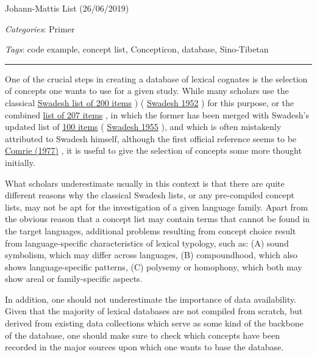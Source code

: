 \documentclass[
  a4paper,
  14pt,
  oneside,
  tablecaptionabove
]{scrbook}
\begin{document}
Johann-Mattis List (26/06/2019)

\emph{Categories}: Primer

\emph{Tags}: code example, concept list, Concepticon, database,
Sino-Tibetan

\begin{center}\rule{0.5\linewidth}{1pt}\end{center}

One of the crucial steps in creating a database of lexical cognates is
the selection of concepts one wants to use for a given study. While many
scholars use the classical
\href{https://concepticon.clld.org/contributions/Swadesh-1952-200}{Swadesh
list of 200 items} ) (
\href{http://bibliography.lingpy.org?key=Swadesh1952}{Swadesh 1952} )
for this purpose, or the combined
\href{https://concepticon.clld.org/contributions/Comrie-1977-207}{list
of 207 items} , in which the former has been merged with Swadesh's
updated list of
\href{https://concepticon.clld.org/paramters/Swadesh-1955-100}{100
items} ( \href{http://bibliography.lingpy.org?key=Swadesh1955}{Swadesh
1955} ), and which is often mistakenly attributed to Swadesh himself,
although the first official reference seems to be
\href{http://bibliography.lingpy.org?key=Comrie1977}{Comrie (1977)} , it
is useful to give the selection of concepts some more thought initially.

What scholars underestimate usually in this context is that there are
quite different reasons why the classical Swadesh lists, or any
pre-compiled concept lists, may not be apt for the investigation of a
given language family. Apart from the obvious reason that a concept list
may contain terms that cannot be found in the target languages,
additional problems resulting from concept choice result from
language-specific characteristics of lexical typology, such as: (A)
sound symbolism, which may differ across languages, (B) compoundhood,
which also shows language-specific patterns, (C) polysemy or homophony,
which both may show areal or family-specific aspects.

In addition, one should not underestimate the importance of data
availability. Given that the majority of lexical databases are not
compiled from scratch, but derived from existing data collections which
serve as some kind of the backbone of the database, one should make sure
to check which concepts have been recorded in the major sources upon
which one wants to base the database.
\end{document}
